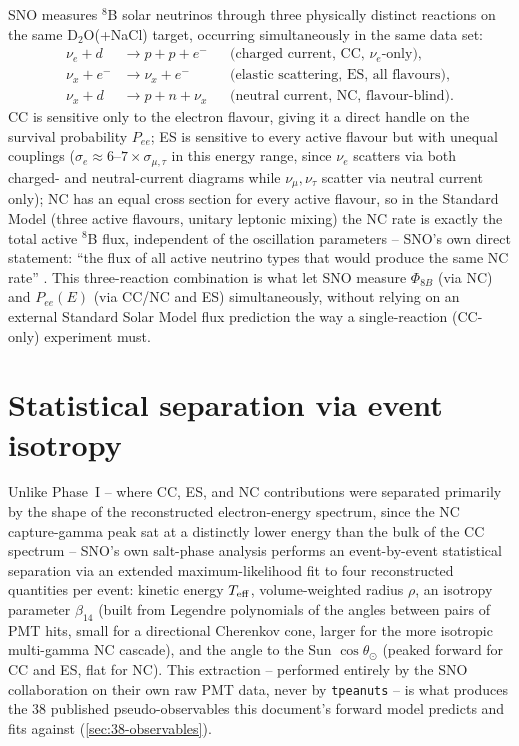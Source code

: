 \begin{theorybox}
SNO measures $^8$B solar neutrinos through three physically distinct
reactions on the same D$_2$O(+NaCl) target, occurring simultaneously in the
same data set:
\begin{align}
  \nu_e + d &\to p + p + e^- &&\text{(charged current, CC, } \nu_e\text{-only)}, \\
  \nu_x + e^- &\to \nu_x + e^- &&\text{(elastic scattering, ES, all flavours)}, \\
  \nu_x + d &\to p + n + \nu_x &&\text{(neutral current, NC, flavour-blind)}.
\end{align}
CC is sensitive only to the electron flavour, giving it a direct handle on
the survival probability $P_{ee}$; ES is sensitive to every active flavour
but with unequal couplings ($\sigma_e\approx6$--$7\times\sigma_{\mu,\tau}$ in
this energy range, since $\nu_e$ scatters via both charged- and
neutral-current diagrams while $\nu_\mu,\nu_\tau$ scatter via neutral current
only); NC has an equal cross section for every active flavour, so in the
Standard Model (three active flavours, unitary leptonic mixing) the NC rate
is exactly the total active $^8$B flux, independent of the oscillation
parameters -- SNO's own direct statement: ``the flux of all active neutrino
types that would produce the same NC rate''
\parencite{Aharmim2005SaltPhase}. This three-reaction combination is what let
SNO measure $\Phi_{8B}$ (via NC) and $P_{ee}(E)$ (via CC/NC and ES)
simultaneously, without relying on an external Standard Solar Model
flux prediction the way a single-reaction (CC-only) experiment must.
\end{theorybox}

\section{Statistical separation via event isotropy}
\label{sec:salt-phase-principle}

\begin{theorybox}
Unlike Phase~I -- where CC, ES, and NC contributions were separated primarily
by the shape of the reconstructed electron-energy spectrum, since the NC
capture-gamma peak sat at a distinctly lower energy than the bulk of the CC
spectrum -- SNO's own salt-phase analysis performs an event-by-event
statistical separation via an extended maximum-likelihood fit to four
reconstructed quantities per event: kinetic energy $T_{\rm eff}$, volume-weighted
radius $\rho$, an isotropy parameter $\beta_{14}$ (built from Legendre
polynomials of the angles between pairs of PMT hits, small for a
directional Cherenkov cone, larger for the more isotropic multi-gamma NC
cascade), and the angle to the Sun $\cos\theta_\odot$ (peaked forward for CC
and ES, flat for NC). This extraction -- performed entirely by the SNO
collaboration on their own raw PMT data, never by \texttt{tpeanuts} -- is
what produces the 38 published pseudo-observables this document's forward
model predicts and fits against (\cref{sec:38-observables}).
\end{theorybox}

